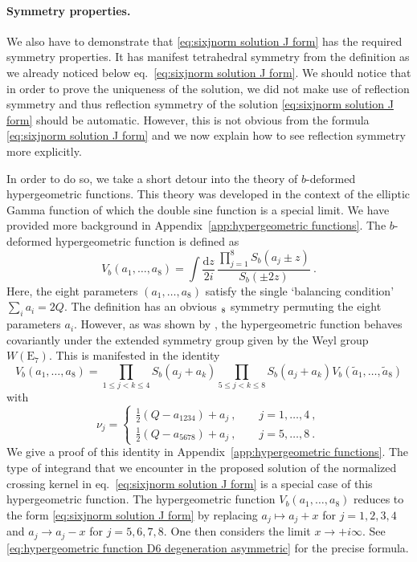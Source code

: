 \documentclass[12pt,a4paper]{article}
\newcommand{\be}{\begin{equation}}
\newcommand{\ee}{\end{equation}}
\renewcommand\d{\text{d}}
\let\S\relax
\DeclareMathOperator\S{S}
\begin{document}
\paragraph{Symmetry properties.} We also have to demonstrate that \eqref{eq:sixjnorm solution J form} has the required symmetry properties. It has manifest tetrahedral symmetry from the definition as we already noticed below eq.~\eqref{eq:sixjnorm solution J form}. We should notice that in order to prove the uniqueness of the solution, we did not make use of reflection symmetry and thus reflection symmetry of the solution \eqref{eq:sixjnorm solution J form} should be automatic. However, this is not obvious from the formula \eqref{eq:sixjnorm solution J form} and we now explain how to see reflection symmetry more explicitly.

In order to do so, we take a short detour into the theory of $b$-deformed hypergeometric functions. This theory was developed in the context of the elliptic Gamma function of which the double sine function is a special limit. We have provided more background in Appendix~\ref{app:hypergeometric functions}. The $b$-deformed hypergeometric function is defined as
\be 
V_b(a_1,\dots,a_8)=\int \frac{\d z}{2i}\, \frac{\prod_{j=1}^8 S_b(a_j \pm z)}{S_b(\pm 2 z)}\ . \label{eq:b-deformed hypergeometric function main text}
\ee
Here, the eight parameters $(a_1,\dots,a_8)$ satisfy the single `balancing condition' $\sum_i a_i=2Q$. The definition has an obvious $\S_8$ symmetry permuting the eight parameters $a_i$. However, as was shown by \cite{Spridonov:theta, Rains:Transformations}, the hypergeometric function behaves covariantly under the extended symmetry group given by the Weyl group $W(\mathrm{E}_7)$. This is manifested in the identity
\be 
V_b(a_1,\dots,a_8)=\prod_{1 \le j<k \le 4} S_b(a_j+a_k)\prod_{5 \le j<k \le 8} S_b(a_{j}+a_{k}) V_b(\tilde{a}_1,\dots,\tilde{a}_8) \label{eq:hypergeometric function E7 symmetry transformation main text}
\ee
with 
\be 
\nu_j=\begin{cases}
    \frac{1}{2}(Q-a_{1234})+a_j\ , \qquad j=1,\dots,4\ , \\
    \frac{1}{2}(Q-a_{5678})+a_j\ , \qquad j=5,\dots,8\ .
\end{cases}
\ee
We give a proof of this identity in Appendix~\ref{app:hypergeometric functions}.
The type of integrand that we encounter in the proposed solution of the normalized crossing kernel in eq.~\eqref{eq:sixjnorm solution J form} is a special case of this hypergeometric function. 
The hypergeometric function $V_b(a_1,\dots,a_8)$ reduces to the form \eqref{eq:sixjnorm solution J form} by replacing $a_j \mapsto a_j+x$ for $j=1,2,3,4$ and $a_j \to a_j-x$ for $j=5,6,7,8$. One then considers the limit $x \to +i\infty$. See \eqref{eq:hypergeometric function D6 degeneration asymmetric} for the precise formula.
\end{document}

